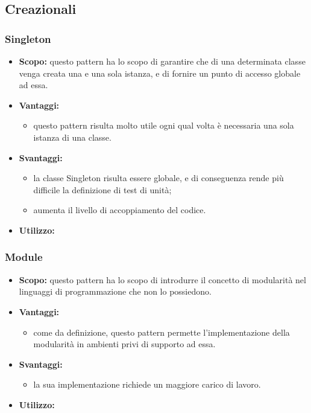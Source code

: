   \subsection{Creazionali}
  
    \subsubsection{Singleton}
      \begin{itemize}
       \item \textbf{Scopo:} questo pattern ha lo scopo di garantire che di una determinata classe venga creata una e una sola istanza, e di fornire un punto di accesso globale ad essa.
	\item \textbf{Vantaggi:}
	  \begin{itemize}
	   \item questo pattern risulta molto utile ogni qual volta è necessaria una sola istanza di una classe.
	  \end{itemize}
	\item \textbf{Svantaggi:}
	  \begin{itemize}
	   \item la classe Singleton risulta essere globale, e di conseguenza rende più difficile la definizione di test di unità;
	   \item aumenta il livello di accoppiamento del codice.
	  \end{itemize}
	\item \textbf{Utilizzo:}
	\end{itemize}
	
	 \subsubsection{Module}
      \begin{itemize}
       \item \textbf{Scopo:} questo pattern ha lo scopo di introdurre il concetto di modularità nel linguaggi di programmazione che non lo possiedono.
	\item \textbf{Vantaggi:}
	  \begin{itemize}
	   \item come da definizione, questo pattern permette l'implementazione della modularità in ambienti privi di supporto ad essa.
	  \end{itemize}
	\item \textbf{Svantaggi:}
	  \begin{itemize}
	   \item la sua implementazione richiede un maggiore carico di lavoro.
	  \end{itemize}
	\item \textbf{Utilizzo:}
	\end{itemize}
